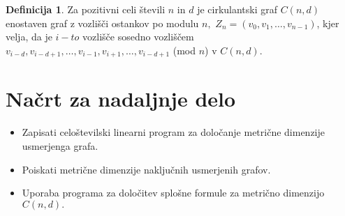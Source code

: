 \documentclass[a4paper,12pt]{article}
\theoremstyle{definition}
\newtheorem{definicija}{Definicija}[section]
\theoremstyle{remark}
\theoremstyle{definition}
\begin{document}
\begin{definicija}
    Za pozitivni celi števili $n$ in $d$ je cirkulantski graf $C(n, d)$ enostaven graf z vozlišči 
    ostankov po modulu $n,$ $Z_n = (v_0, v_1, \dots ,v_{n-1})$, kjer velja, da je $i-to$ vozlišče 
    sosedno vozliščem $v_{i-d}, v_{i-d+1}, \dots ,v_{i-1}, v_{i+1}, \dots ,v_{i-d+1}$ (mod $n$)
    v $C(n,d).$ \cite{Chau2017}
\end{definicija}

\section{Načrt za nadaljnje delo}

\begin{itemize}
    \item Zapisati celoštevilski linearni program za določanje metrične dimenzije usmerjenga grafa. 
    \item Poiskati metrične dimenzije naključnih usmerjenih grafov.
    \item Uporaba programa za določitev splošne formule za metrično dimenzijo $C(n, d).$
\end{itemize}



\end{document}
